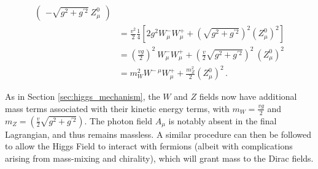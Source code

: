 \begin{equation}
\begin{split}
\begin{pmatrix}
                 - \sqrt{g^2 + g^{\prime 2}}\ Z^0_{\mu}
            \end{pmatrix} \\
        & = \frac{v^2}{2} \frac{1}{4} 
            \left[ 2 g^2  W^-_{\mu} W^+_{\mu}
            + \left(\sqrt{g^2 + g^{\prime 2}}\right)^2 (Z^0_{\mu})^2 \right] \\
        & = \left(\frac{vg}{2}\right)^2\  W^-_{\mu} W^+_{\mu}
            + \left(\frac{v}{2}\sqrt{g^2 + g^{\prime 2}}\right)^2\ (Z^0_{\mu})^2 \\
        & = m_W^2 W^{-\ \mu} W^+_{\mu} + \frac{m_Z^2}{2} (Z^0_{\mu})^2
        \,.
    \end{split} \end{equation}

    As in Section \ref{sec:higgs_mechanism}, the $W$ and $Z$ fields now have additional mass terms associated with their kinetic energy terms,
        with $m_W = \frac{vg}{2}$ and $m_Z = \left(\frac{v}{2}\sqrt{g^2 + g^{\prime 2}}\right) $.
    The photon field $A_{\mu}$ is notably absent in the final Lagrangian, and thus remains massless.
    A similar procedure can then be followed to allow the Higgs Field to interact with fermions
        (albeit with complications arising from mass-mixing and chirality),
        which will grant mass to the Dirac fields.





